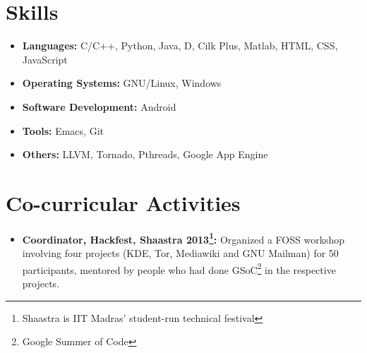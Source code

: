 \documentclass[letterpaper,11pt]{resume}
\begin{document}
\section{Skills}
\begin{itemize}
  \item {\bf Languages:} C/C++, Python, Java, D, Cilk Plus, Matlab, HTML, CSS, JavaScript	
  \item {\bf Operating Systems:} GNU/Linux, Windows
  \item {\bf Software Development:} Android
  \item {\bf Tools:} Emacs, Git
  \item {\bf Others:} LLVM, Tornado, Pthreads, Google App Engine
  \end{itemize} %
\section{Co-curricular Activities}
\begin{itemize}
  \item {\bf Coordinator, Hackfest, Shaastra 2013\footnote{Shaastra is IIT Madras' student-run technical festival}: } Organized a FOSS workshop involving four projects (KDE, Tor, Mediawiki and GNU Mailman) for 50 participants, mentored by people who had done GSoC\footnote{Google Summer of Code} in the respective projects.
  \end{itemize} 
   
\end{document}
